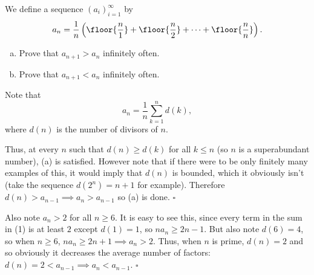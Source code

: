 
\begin{problem}[ISL 2006 N3]
    We define a sequence $(a_i)_{i=1}^\infty$ by
    \[a_n = \frac {1}{n}\left(\floor{\frac n1} + \floor{\frac n2} + \cdots + \floor{\frac nn}\right).\]
    \begin{enumerate}[(a),itemsep=-6pt]
        \item Prove that $a_{n+1}>a_n$ infinitely often.
        \item Prove that $a_{n+1}<a_n$ infinitely often.
    \end{enumerate}
\end{problem}

\begin{solution}
    Note that \[a_n = \frac1n \sum_{k=1}^n d(k), \tag{1}\] where $d(n)$ is the number of divisors of $n$.
    
    Thus, at every $n$ such that $d(n) \geq d(k)$ for all $k \leq n$ (so $n$ is a superabundant number), (a) is satisfied. However note that if there were to be only finitely many examples of this, it would imply that $d(n)$ is bounded, which it obviously isn't (take the sequence $d(2^n) = n+1$ for example). Therefore $d(n) > a_{n-1} \implies a_n > a_{n-1}$ so (a) is done. $\square$
    
    Also note $a_n > 2$ for all $n \geq 6$. It is easy to see this, since every term in the sum in (1) is at least $2$ except $d(1) = 1$, so $na_n \geq 2n-1$. But also note $d(6) = 4$, so when $n \geq 6$, $na_n \geq 2n+1 \implies a_n > 2$. Thus, when $n$ is prime, $d(n) = 2$ and so obviously it decreases the average number of factors: $d(n) = 2 < a_{n-1} \implies a_n < a_{n-1}$. $\square$
\end{solution}
